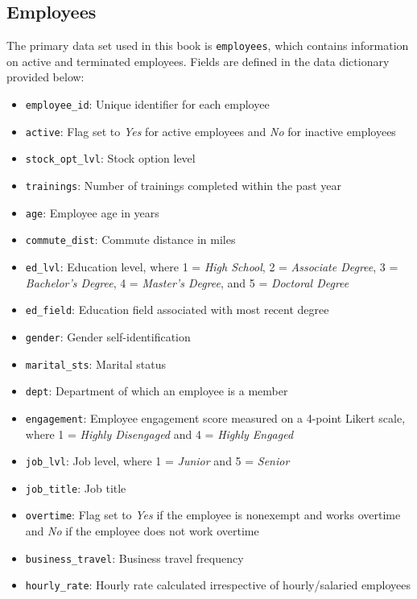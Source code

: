 \documentclass[
]{book}
\providecommand{\tightlist}{%
  \setlength{\itemsep}{0pt}\setlength{\parskip}{0pt}}
\begin{document}
\hypertarget{employees}{%
\subsection{Employees}\label{employees}}

The primary data set used in this book is \texttt{employees}, which contains information on active and terminated employees. Fields are defined in the data dictionary provided below:

\begin{itemize}
\tightlist
\item
  \texttt{employee\_id}: Unique identifier for each employee
\item
  \texttt{active}: Flag set to \emph{Yes} for active employees and \emph{No} for inactive employees
\item
  \texttt{stock\_opt\_lvl}: Stock option level
\item
  \texttt{trainings}: Number of trainings completed within the past year
\item
  \texttt{age}: Employee age in years
\item
  \texttt{commute\_dist}: Commute distance in miles
\item
  \texttt{ed\_lvl}: Education level, where 1 = \emph{High School}, 2 = \emph{Associate Degree}, 3 = \emph{Bachelor's Degree}, 4 = \emph{Master's Degree}, and 5 = \emph{Doctoral Degree}
\item
  \texttt{ed\_field}: Education field associated with most recent degree
\item
  \texttt{gender}: Gender self-identification
\item
  \texttt{marital\_sts}: Marital status
\item
  \texttt{dept}: Department of which an employee is a member
\item
  \texttt{engagement}: Employee engagement score measured on a 4-point Likert scale, where 1 = \emph{Highly Disengaged} and 4 = \emph{Highly Engaged}
\item
  \texttt{job\_lvl}: Job level, where 1 = \emph{Junior} and 5 = \emph{Senior}
\item
  \texttt{job\_title}: Job title
\item
  \texttt{overtime}: Flag set to \emph{Yes} if the employee is nonexempt and works overtime and \emph{No} if the employee does not work overtime
\item
  \texttt{business\_travel}: Business travel frequency
\item
  \texttt{hourly\_rate}: Hourly rate calculated irrespective of hourly/salaried employees

\end{itemize}
\end{document}
